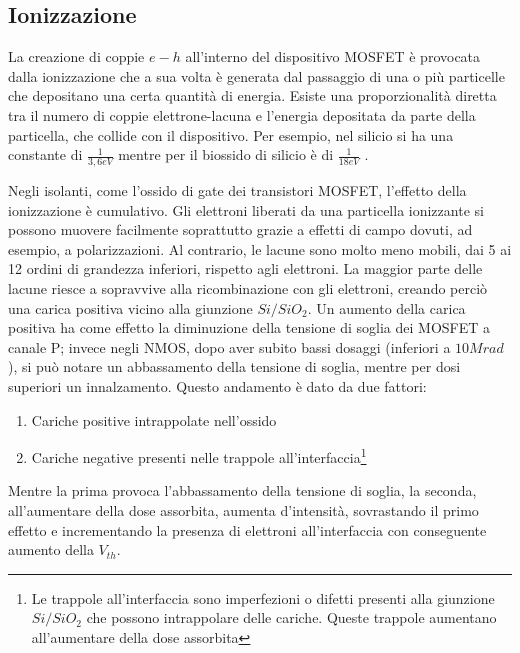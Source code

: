\vspace{0.5cm}

\subsection{Ionizzazione}\label{cap1:ionizzazione}
La creazione di coppie $e-h$ all'interno del dispositivo MOSFET è provocata dalla ionizzazione che a sua volta è generata dal passaggio di una o più particelle che depositano una certa quantità di energia. Esiste una proporzionalità diretta tra il numero di coppie elettrone-lacuna e l'energia depositata da parte della particella, che collide con il dispositivo. Per esempio, nel silicio si ha una constante di $\frac{1}{3,6eV}$ mentre per il biossido di silicio è di $\frac{1}{18eV}$ \cite{bib:Effetti_Radiazioni_NASA}.





\vspace{0.5cm}

Negli isolanti, come l'ossido di gate dei transistori MOSFET, l'effetto della ionizzazione è cumulativo. Gli elettroni liberati da una particella ionizzante si possono muovere facilmente soprattutto grazie a effetti di campo dovuti, ad esempio, a polarizzazioni.
Al contrario, le lacune sono molto meno mobili, dai 5 ai 12 ordini di grandezza inferiori, rispetto agli elettroni. La maggior parte delle lacune riesce a sopravvive alla ricombinazione con gli elettroni, creando perciò una carica positiva vicino alla giunzione $Si/SiO_2$. Un aumento della carica positiva ha come effetto la diminuzione della tensione di soglia dei MOSFET a canale P; invece negli NMOS, dopo aver subito bassi dosaggi (inferiori a $10Mrad$), si può notare un abbassamento della tensione di soglia, mentre per dosi superiori un innalzamento. Questo andamento è dato da due fattori:
\begin{enumerate}
	\item Cariche positive intrappolate nell'ossido
	\item Cariche negative presenti nelle trappole all'interfaccia\footnote{Le trappole all'interfaccia sono imperfezioni o difetti presenti alla giunzione $Si/SiO_2$ che possono intrappolare delle cariche. Queste trappole aumentano all'aumentare della dose assorbita}
\end{enumerate}
Mentre la prima provoca l'abbassamento della tensione di soglia, la seconda, all'aumentare della dose assorbita, aumenta d'intensità, sovrastando il primo effetto e incrementando la presenza di elettroni all'interfaccia con conseguente aumento della $V_{th}$.  

